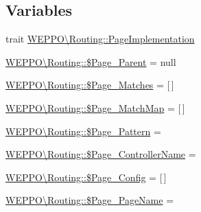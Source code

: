 \subsection*{Variables}
\begin{DoxyCompactItemize}
\item 
trait \hyperlink{namespaceWEPPO_1_1Routing_aac0fe5dacae50c1c13751c1c3087ea23}{W\+E\+P\+P\+O\textbackslash{}\+Routing\+::\+Page\+Implementation}
\item 
\hyperlink{namespaceWEPPO_1_1Routing_ada0493ec510703be558950d16b90a7f5}{W\+E\+P\+P\+O\textbackslash{}\+Routing\+::\$\+Page\+\_\+\+Parent} = null
\item 
\hyperlink{namespaceWEPPO_1_1Routing_a238c346b9f68ddab9ce40d2094ffcb21}{W\+E\+P\+P\+O\textbackslash{}\+Routing\+::\$\+Page\+\_\+\+Matches} = \mbox{[}$\,$\mbox{]}
\item 
\hyperlink{namespaceWEPPO_1_1Routing_aabacc51b76846d3f35a89de4ec669dc9}{W\+E\+P\+P\+O\textbackslash{}\+Routing\+::\$\+Page\+\_\+\+Match\+Map} = \mbox{[}$\,$\mbox{]}
\item 
\hyperlink{namespaceWEPPO_1_1Routing_abc80c4144676c663ac4c7ced77e02494}{W\+E\+P\+P\+O\textbackslash{}\+Routing\+::\$\+Page\+\_\+\+Pattern} = \textquotesingle{}\textquotesingle{}
\item 
\hyperlink{namespaceWEPPO_1_1Routing_ac1cd50e9921f7d4215806c1e179c3fe7}{W\+E\+P\+P\+O\textbackslash{}\+Routing\+::\$\+Page\+\_\+\+Controller\+Name} = \textquotesingle{}\textquotesingle{}
\item 
\hyperlink{namespaceWEPPO_1_1Routing_a79e334dc5c377bf5384bcc4934b58bd8}{W\+E\+P\+P\+O\textbackslash{}\+Routing\+::\$\+Page\+\_\+\+Config} = \mbox{[}$\,$\mbox{]}
\item 
\hyperlink{namespaceWEPPO_1_1Routing_ae8eda6bdaa0e8c0fa885c978fb315802}{W\+E\+P\+P\+O\textbackslash{}\+Routing\+::\$\+Page\+\_\+\+Page\+Name} = \textquotesingle{}\textquotesingle{}
\end{DoxyCompactItemize}
